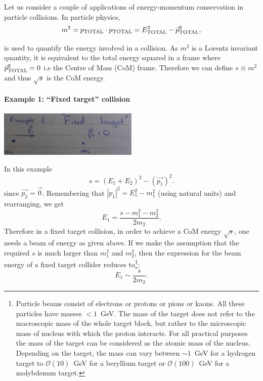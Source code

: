 \noindent Let us consider a couple of applications of energy-momentum conservation
in particle collisions. In particle physics,
\noindent 
\[
m^{2}=p_{\rm TOTAL}\cdot p_{\rm TOTAL}=E^{2}_{\rm TOTAL}-\vec{p}^{2}_{\rm TOTAL},
\]

is used to quantify the energy involved in a collision. As $m^{2}$ is a Lorentz invariant quantity, 
it is equivalent to the total energy squared in a frame where $\vec{p}^{2}_{\rm TOTAL}=0$ 
i.e the Centre of Mass (CoM) frame. Therefore we can define $s\equiv m^2$ and  thus $\sqrt{s}$ is the CoM energy.

\paragraph{Example 1: ``Fixed target'' collision}
\begin{center}
\includegraphics[width=0.5\textwidth]{fig/collisions/collisions_example1.jpg}
\end{center}

In this example
\[
s=(E_{1}+E_{2})^{2}-(\vec{p_1})^2.
\]
since $\vec{p_2}=\vec{0}$. Remembering 
that $|p_1|^2=E_{1}^{2}-m_{1}^{2}$ (using natural units) and rearranging, we get
\[
E_{1}=\frac{s-m_{1}^{2}-m_{2}^{2}}{2m_{2}}.
\]
\noindent Therefore in a fixed target collision, in order to achieve a CoM 
energy $\sqrt{s}$, one needs a beam of energy as given above.  If we make the assumption that the required $s$ is much larger than $m_{1}^2$ and $m_{2}^{2}$, then the expression for the beam energy of a fixed target collider reduces to\footnote{Particle beams
consist of electrons or protons or pions or kaons. All these particles have masses $<1$~GeV.
The mass of the target does not refer to the macroscopic mass of the whole target block, but rather to the microscopic mass of nucleus with which the proton interacts. For all practical purposes the mass of the target can be considered as the atomic mass of the nucleus. Depending on the target, the mass can vary between $\sim 1$~GeV for a hydrogen target to $\mathcal{O}(10)$~GeV for a beryllium target or $\mathcal{O}(100)$~GeV for a molybdenum target.}:
\begin{equation}
\label{eq:e_fixed_target}
E_{1}\sim \frac{s}{2m_{2}}.
\end{equation}

